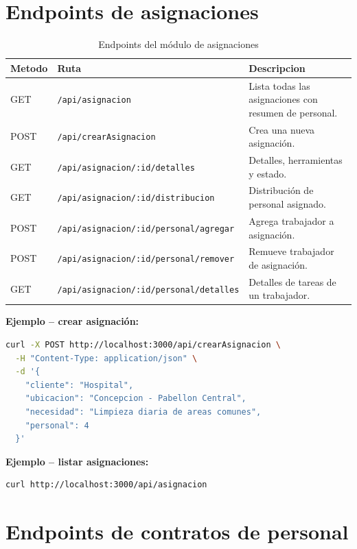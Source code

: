 \documentclass[12pt,a4paper]{report}
\begin{document}
\pagebreak
\section{Endpoints de asignaciones}

\begin{longtable}{@{}p{1.5cm}p{5.5cm}p{6.5cm}@{}}
  \caption{Endpoints del módulo de asignaciones} \\
  \toprule
  \textbf{Metodo} & \textbf{Ruta} & \textbf{Descripcion} \\
  \midrule
  \endfirsthead
  GET & \scriptsize\texttt{/api/asignacion} & Lista todas las asignaciones con resumen de personal. \\
  POST & \scriptsize\texttt{/api/crearAsignacion} & Crea una nueva asignación. \\
  GET & \scriptsize\texttt{/api/asignacion/:id/detalles} & Detalles, herramientas y estado. \\
  GET & \scriptsize\texttt{/api/asignacion/:id/distribucion} & Distribución de personal asignado. \\
  POST & \scriptsize\texttt{/api/asignacion/:id/personal/agregar} & Agrega trabajador a asignación. \\
  POST & \scriptsize\texttt{/api/asignacion/:id/personal/remover} & Remueve trabajador de asignación. \\
  GET & \scriptsize\texttt{/api/asignacion/:id/personal/detalles} & Detalles de tareas de un trabajador. \\
  \bottomrule
\end{longtable}

\textbf{Ejemplo -- crear asignación:}
\begin{lstlisting}[language=bash]
curl -X POST http://localhost:3000/api/crearAsignacion \
  -H "Content-Type: application/json" \
  -d '{
    "cliente": "Hospital",
    "ubicacion": "Concepcion - Pabellon Central",
    "necesidad": "Limpieza diaria de areas comunes",
    "personal": 4
  }'
\end{lstlisting}

\textbf{Ejemplo -- listar asignaciones:}
\begin{lstlisting}[language=bash]
curl http://localhost:3000/api/asignacion
\end{lstlisting}

\pagebreak
\section{Endpoints de contratos de personal}
\end{document}
